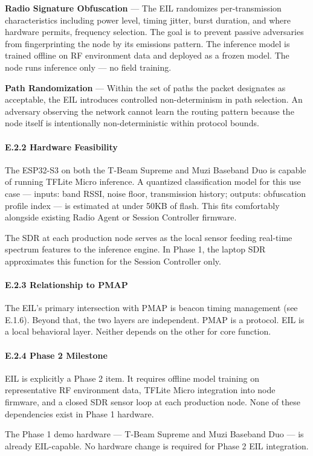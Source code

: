 \documentclass[
  11pt,
]{article}
\begin{document}
\textbf{Radio Signature Obfuscation} --- The EIL randomizes
per-transmission characteristics including power level, timing jitter,
burst duration, and where hardware permits, frequency selection. The
goal is to prevent passive adversaries from fingerprinting the node by
its emissions pattern. The inference model is trained offline on RF
environment data and deployed as a frozen model. The node runs inference
only --- no field training.

\textbf{Path Randomization} --- Within the set of paths the packet
designates as acceptable, the EIL introduces controlled non-determinism
in path selection. An adversary observing the network cannot learn the
routing pattern because the node itself is intentionally
non-deterministic within protocol bounds.

\hypertarget{e.2.2-hardware-feasibility}{%
\paragraph{E.2.2 Hardware
Feasibility}\label{e.2.2-hardware-feasibility}}

The ESP32-S3 on both the T-Beam Supreme and Muzi Baseband Duo is capable
of running TFLite Micro inference. A quantized classification model for
this use case --- inputs: band RSSI, noise floor, transmission history;
outputs: obfuscation profile index --- is estimated at under 50KB of
flash. This fits comfortably alongside existing Radio Agent or Session
Controller firmware.

The SDR at each production node serves as the local sensor feeding
real-time spectrum features to the inference engine. In Phase 1, the
laptop SDR approximates this function for the Session Controller only.

\hypertarget{e.2.3-relationship-to-pmap}{%
\paragraph{E.2.3 Relationship to
PMAP}\label{e.2.3-relationship-to-pmap}}

The EIL's primary intersection with PMAP is beacon timing management
(see E.1.6). Beyond that, the two layers are independent. PMAP is a
protocol. EIL is a local behavioral layer. Neither depends on the other
for core function.

\hypertarget{e.2.4-phase-2-milestone}{%
\paragraph{E.2.4 Phase 2 Milestone}\label{e.2.4-phase-2-milestone}}

EIL is explicitly a Phase 2 item. It requires offline model training on
representative RF environment data, TFLite Micro integration into node
firmware, and a closed SDR sensor loop at each production node. None of
these dependencies exist in Phase 1 hardware.

The Phase 1 demo hardware --- T-Beam Supreme and Muzi Baseband Duo ---
is already EIL-capable. No hardware change is required for Phase 2 EIL
integration.
\end{document}
